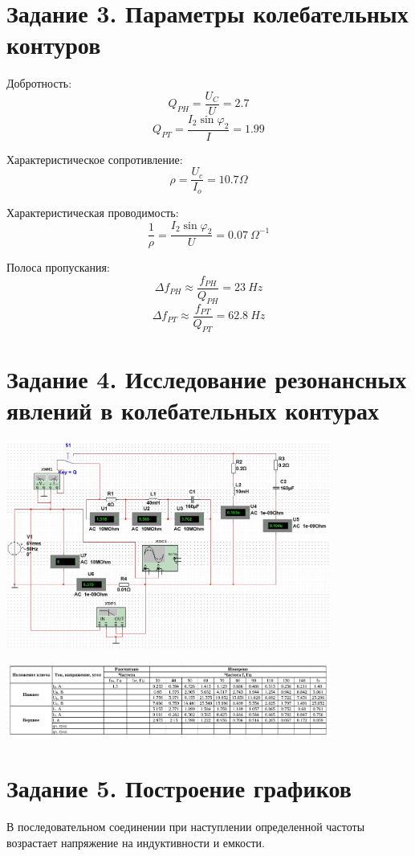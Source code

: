 \documentclass[14pt, a4paper]{article}
\begin{document}
    \section*{Задание 3. Параметры колебательных контуров}
        Добротность:
        $$Q_{PH} = \frac{U_C}{U} = 2.7$$
        $$Q_{PT} = \frac{I_2\sin\varphi_2}{I} = 1.99$$

        Характеристическое сопротивление:
        $$\rho = \frac{U_c}{I_o} = 10.7 \Omega$$

        Характеристическая проводимость:
        $$\frac{1}{\rho} = \frac{I_2\sin\varphi_2}{U} = 0.07 \ \Omega^{-1}$$

        Полоса пропускания:
        $$\Delta f_{PH} \approx \frac{f_{PH}}{Q_{PH}} = 23 \ Hz$$
        $$\Delta f_{PT} \approx \frac{f_{PT}}{Q_{PT}} = 62.8 \ Hz$$ 


    \section*{Задание 4. Исследование резонансных явлений в колебательных контурах}
        {
            \includegraphics[width=0.8\textwidth]{Design.jpg}
        }
        
        {
            \includegraphics[width=0.8\textwidth]{table2.jpg}
        }


    \section*{Задание 5. Построение графиков}
        В последовательном соединении при наступлении определенной частоты возрастает напряжение на индуктивности и емкости.
\end{document}

